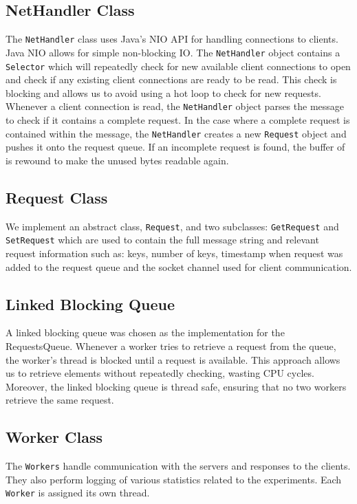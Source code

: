 \documentclass[11pt,a4paper]{article}
\begin{document}
\subsection{NetHandler Class}
The \texttt{NetHandler} class uses Java's NIO API for handling connections to clients. Java NIO allows for simple non-blocking IO. The \texttt{NetHandler} object contains a \texttt{Selector} which will repeatedly check for new available client connections to open and check if any existing client connections are ready to be read. This check is blocking and allows us to avoid using a hot loop to check for new requests.\\
Whenever a client connection is read, the \texttt{NetHandler} object parses the message to check if it contains a complete request. In the case where a complete request is contained within the message, the \texttt{NetHandler} creates a new \texttt{Request} object and pushes it onto the request queue. If an incomplete request is found, the buffer of is rewound to make the unused bytes readable again.

\subsection{Request Class}
We implement an abstract class, \texttt{Request}, and two subclasses: \texttt{GetRequest} and \texttt{SetRequest} which are used to contain the full message string and relevant request information such as: keys, number of keys, timestamp when request was added to the request queue and the socket channel used for client communication.


\subsection{Linked Blocking Queue}
A linked blocking queue was chosen as the implementation for the RequestsQueue. Whenever a worker tries to retrieve a request from the queue, the worker's thread is blocked until a request is available. This approach allows us to retrieve elements without repeatedly checking, wasting CPU cycles. Moreover, the linked blocking queue is thread safe, ensuring that no two workers retrieve the same request. 

\subsection{Worker Class}
The \texttt{Workers} handle communication with the servers and responses to the clients. They also perform logging of various statistics related to the experiments. Each \texttt{Worker} is assigned its own thread.
\end{document}
